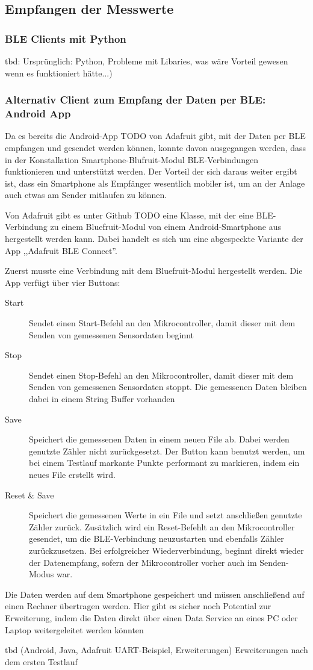 \subsection{Empfangen der Messwerte}

\subsubsection{BLE Clients mit Python}
tbd: Ursprünglich: Python, Probleme mit Libaries, was wäre Vorteil gewesen wenn es funktioniert hätte...)

\subsubsection{Alternativ Client zum Empfang der Daten per BLE: Android App}
Da es bereits die Android-App TODO von Adafruit gibt, mit der Daten per BLE empfangen und gesendet werden können, konnte davon ausgegangen werden, dass in der Konstallation Smartphone-Blufruit-Modul BLE-Verbindungen funktionieren und unterstützt werden. Der Vorteil der sich daraus weiter ergibt ist, dass ein Smartphone als Empfänger wesentlich mobiler ist, um an der Anlage auch etwas am Sender mitlaufen zu können. 

Von Adafruit gibt es unter Github TODO eine Klasse, mit der eine BLE-Verbindung zu einem Bluefruit-Modul von einem Android-Smartphone aus hergestellt werden kann. Dabei handelt es sich um eine abgespeckte Variante der App ,,Adafruit BLE Connect''. 

Zuerst musste eine Verbindung mit dem Bluefruit-Modul hergestellt werden. Die App verfügt über vier Buttons:
\begin{description}
	\item[Start] Sendet einen Start-Befehl an den Mikrocontroller, damit dieser mit dem Senden von gemessenen Sensordaten beginnt
	\item[Stop] Sendet einen Stop-Befehl an den Mikrocontroller, damit dieser mit dem Senden von gemessenen Sensordaten stoppt. Die gemessenen Daten bleiben dabei in einem String Buffer vorhanden
	\item[Save] Speichert die gemessenen Daten in einem neuen File ab. Dabei werden genutzte Zähler nicht zurückgesetzt. Der Button kann benutzt werden, um bei einem Testlauf markante Punkte performant zu markieren, indem ein neues File erstellt wird.
	\item[Reset \& Save] Speichert die gemessenen Werte in ein File und setzt anschließen genutzte Zähler zurück. Zusätzlich wird ein Reset-Befehlt an den Mikrocontroller gesendet, um die BLE-Verbindung neuzustarten und ebenfalls Zähler zurückzusetzen. Bei erfolgreicher Wiederverbindung, beginnt direkt wieder der Datenempfang, sofern der Mikrocontroller vorher auch im Senden-Modus war.
\end{description}


Die Daten werden auf dem Smartphone gespeichert und müssen anschließend auf einen Rechner übertragen werden. Hier gibt es sicher noch Potential zur Erweiterung, indem die Daten direkt über einen Data Service an eines PC oder Laptop weitergeleitet werden könnten

tbd (Android, Java, Adafruit UART-Beispiel, Erweiterungen)
Erweiterungen nach dem ersten Testlauf